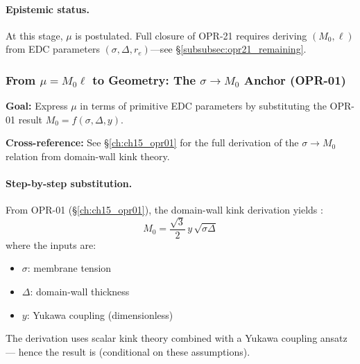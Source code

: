\paragraph{Epistemic status.}
At this stage, $\mu$ is \tagP{} postulated. Full closure of OPR-21 requires
deriving $(M_0, \ell)$ from EDC parameters $(\sigma, \Delta, r_e)$---see
\S\ref{subsubsec:opr21_remaining}.

\subsubsection{From $\mu = M_0\ell$ to Geometry: The $\sigma \to M_0$ Anchor (OPR-01)}
\label{subsubsec:opr21_mu_bridge}

\begin{tcolorbox}[colback=blue!3!white, colframe=blue!50!black,
    title=\textbf{OPR-01 Bridge: Parameter Reduction}]
\textbf{Goal:} Express $\mu$ in terms of primitive EDC parameters by
substituting the OPR-01 result $M_0 = f(\sigma, \Delta, y)$.

\textbf{Cross-reference:} See \S\ref{ch:ch15_opr01} for the full derivation
of the $\sigma \to M_0$ relation from domain-wall kink theory.
\end{tcolorbox}

\paragraph{Step-by-step substitution.}
From OPR-01 (\S\ref{ch:ch15_opr01}), the domain-wall kink derivation yields \tagDc{}:
\begin{equation}
    M_0 = \frac{\sqrt{3}}{2}\, y \, \sqrt{\sigma \Delta}
    \label{eq:opr21:M0_from_opr01}
\end{equation}
where the inputs are:
\begin{itemize}[nosep]
    \item $\sigma$: membrane tension \tagP{}
    \item $\Delta$: domain-wall thickness \tagP{}
    \item $y$: Yukawa coupling (dimensionless) \tagP{}
\end{itemize}
The derivation uses scalar kink theory \tagM{} combined with a Yukawa coupling
ansatz \tagP{} --- hence the result is \tagDc{} (conditional on these assumptions).

